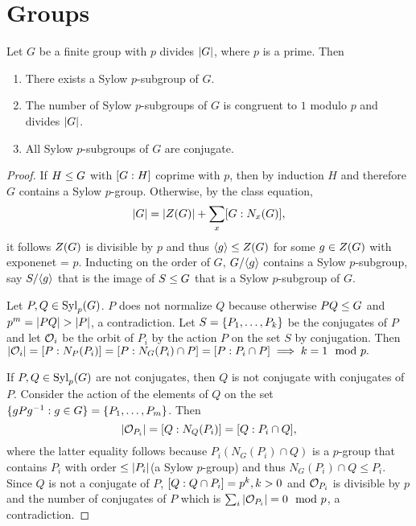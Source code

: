 \chapter{Groups}

\begin{theorem}
    Let $G$ be a finite group with $p$ divides $|G|$, where $p$ is a prime. Then
    \begin{enumerate}
        \item There exists a Sylow $p$-subgroup of $G$.
        \item The number of Sylow $p$-subgroups of $G$ is congruent to $1$ modulo $p$ and divides $|G|$.
        \item All Sylow $p$-subgroups of $G$ are conjugate.
    \end{enumerate}
\end{theorem}

\begin{proof}
    If $H \leq G$ with $[G : H]$ coprime with $p$, then by induction $H$ and therefore $G$ contains a Sylow $p$-group. Otherwise, by the class equation,
    $$|G| = |Z(G)| +  \sum_{x} [G : N_x(G)], $$
    it follows $Z(G)$ is divisible by $p$ and thus $\langle g \rangle \leq Z(G)$ for some $g \in Z(G)$ with exponenet = $p$. Inducting on the order of $G$, $G/\langle g \rangle$ contains a Sylow $p$-subgroup, say $S/\langle g \rangle$ that is the image of $S \leq G$ that is a Sylow $p$-subgroup of $G$. 
    
    Let $P, Q \in \text{Syl}_p(G)$. $P$ does not normalize $Q$ because otherwise $PQ \leq G$ and $p^m = |PQ| > |P|$, a contradiction. Let $S = \{P_1, \dots, P_k\}$ be the conjugates of $P$ and let $\mathcal{O}_{i}$ be the orbit of $P_i$ by the action $P$ on the  set $S$ by conjugation. Then $|\mathcal{O}_{i}| = [P : N_P(P_i)] = [P : N_G(P_i) \cap P] = [P : P_i \cap P] \implies k = 1 \mod p.$

    If $P, Q \in \text{Syl}_p(G)$ are not conjugates, then $Q$ is not conjugate with conjugates of $P$.
    Consider the action of the elements of $Q$ on the set $\{gPg^{-1} : g \in G\} = \{P_1, \dots, P_m\}$. Then 
    $$|\mathcal{O}_{P_i}| = [Q : N_Q(P_i)] = [Q : P_i \cap Q], $$
    where the latter equality follows because $P_i(N_G(P_i) \cap Q)$ is a $p$-group that contains $P_i$ with order $\leq |P_i|$(a Sylow $p$-group) and thus $ N_G(P_i)\cap Q \leq P_i$. Since $Q$ is not a conjugate of $P$, $[Q : Q \cap P_i] = p^k, k > 0$ and $ \mathcal{O}_{P_i}$ is divisible by $p$ and the number of conjugates of $P$ which is $\sum_i |\mathcal{O}_{P_i}| = 0 \mod p$, a contradiction.
    \end{proof}


